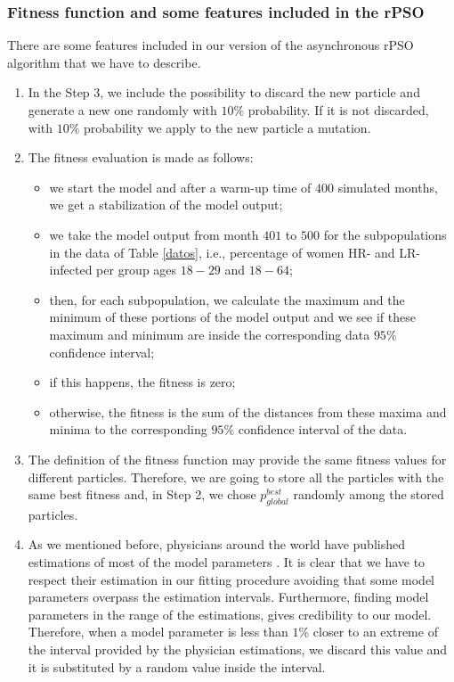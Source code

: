 \subsubsection{Fitness function and some features included in the rPSO}\label{sec:rPSO}
There are some features included in our version of the asynchronous rPSO algorithm that we have to describe. 

\begin{enumerate}
	\item In the Step 3, we include the possibility to discard the new particle and generate a new one randomly with $10\%$ probability. If it is not discarded, with $10\%$ probability we apply to the new particle a mutation.  
	\item The fitness evaluation is made as follows: 
	\begin{itemize}
		\item we start the model and after a warm-up time of $ 400 $ simulated months, we get a stabilization of the model output; 
		\item we take the model output from month $ 401 $ to $ 500 $ for the subpopulations in the data of Table \ref{datos}, i.e., percentage of women HR- and LR-infected per group ages $18-29$ and $18-64$;  
		\item then, for each subpopulation, we calculate the maximum and the minimum of these portions of the model output and we see if these maximum and minimum are inside the corresponding data $95\%$ confidence interval;
		\item if this happens, the fitness is zero; 
		\item otherwise, the fitness is the sum of the distances from these maxima and minima to the corresponding $95\%$ confidence interval of the data.
	\end{itemize}
	
	\item The definition of the fitness function may provide the same fitness values for different particles. Therefore, we are going to store all the particles with the same best fitness and, in Step 2, we chose  $p_{global}^{best}$ randomly among the stored particles.	
	\item As we mentioned before, physicians around the world have published estimations of most of the model parameters \cite{Durex2002,elbasha2007model,Giuliano2011,Nyitray2015}. It is clear that we have to respect their estimation in our fitting procedure avoiding that some model parameters overpass the estimation intervals. Furthermore, finding model parameters in the range of the estimations, gives credibility to our model. Therefore, when a model parameter is less than $1\%$ closer to an extreme of the interval provided by the physician estimations, we discard this value and it is substituted by a random value inside the interval.  
\end{enumerate}

